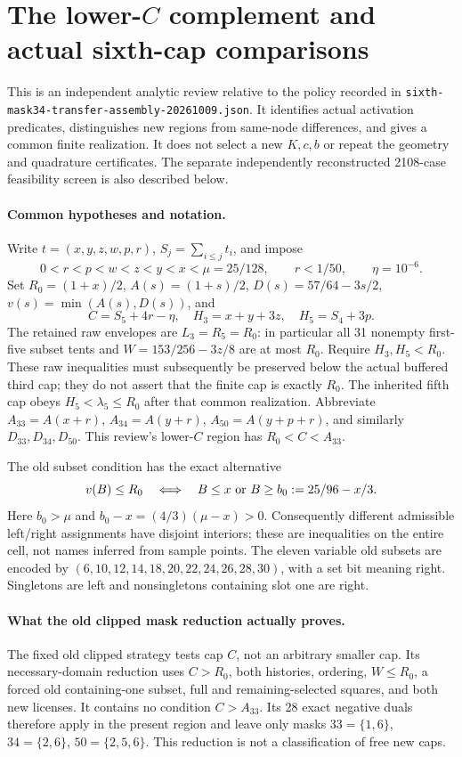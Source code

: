 \section*{The lower-$C$ complement and actual sixth-cap comparisons}
\label{sec:sixth-lower-complement-independent}
This is an independent analytic review relative to the policy recorded in
\texttt{sixth-mask34-transfer-assembly-20261009.json}. It identifies actual
activation predicates, distinguishes new regions from same-node differences,
and gives a common finite realization. It does not select a new $K,c,b$ or
repeat the geometry and quadrature certificates. The separate independently
reconstructed 2108-case feasibility screen is also described below.

\paragraph{Common hypotheses and notation.}
Write $t=(x,y,z,w,p,r)$, $S_j=\sum_{i\le j}t_i$, and impose
\[
 0<r<p<w<z<y<x<\mu=25/128,\qquad r<1/50,\qquad \eta=10^{-6}.
\]
Set $R_0=(1+x)/2$, $A(s)=(1+s)/2$, $D(s)=57/64-3s/2$,
$v(s)=\min(A(s),D(s))$, and
\[
 C=S_5+4r-\eta,\quad H_3=x+y+3z,\quad H_5=S_4+3p.
\]
The retained raw envelopes are $L_3=R_5=R_0$: in particular all 31
nonempty first-five subset tents and $W=153/256-3z/8$ are at most $R_0$.
Require $H_3,H_5<R_0$. These raw inequalities must subsequently be
preserved below the actual buffered third cap; they do not assert that the
finite cap is exactly $R_0$. The inherited fifth cap obeys
$H_5<\lambda_5\le R_0$ after that common realization.
Abbreviate $A_{33}=A(x+r)$, $A_{34}=A(y+r)$,
$A_{50}=A(y+p+r)$, and similarly $D_{33},D_{34},D_{50}$.
This review's lower-$C$ region has $R_0<C<A_{33}$.

The old subset condition has the exact alternative
\begin{equation}\label{eq:lowercomp-old-dichotomy}
 v(B)\le R_0\quad\Longleftrightarrow\quad
 B\le x\ \hbox{or}\ B\ge b_0:=25/96-x/3.
\end{equation}
Here $b_0>\mu$ and $b_0-x=(4/3)(\mu-x)>0$.
Consequently different admissible left/right assignments have disjoint
interiors; these are inequalities on the entire cell, not names inferred
from sample points. The eleven variable old subsets are encoded by
$(6,10,12,14,18,20,22,24,26,28,30)$, with a set bit meaning right.
Singletons are left and nonsingletons containing slot one are right.

\paragraph{What the old clipped mask reduction actually proves.}
The fixed old clipped strategy tests cap $C$, not an arbitrary smaller cap.
Its necessary-domain reduction uses $C>R_0$, both histories, ordering,
$W\le R_0$, a forced old containing-one subset, full and remaining-selected
squares, and both new licenses. It contains no condition $C>A_{33}$.
Its 28 exact negative duals therefore apply in the present region and
leave only masks $33=\{1,6\}$, $34=\{2,6\}$, $50=\{2,5,6\}$.
This reduction is not a classification of free new caps.

